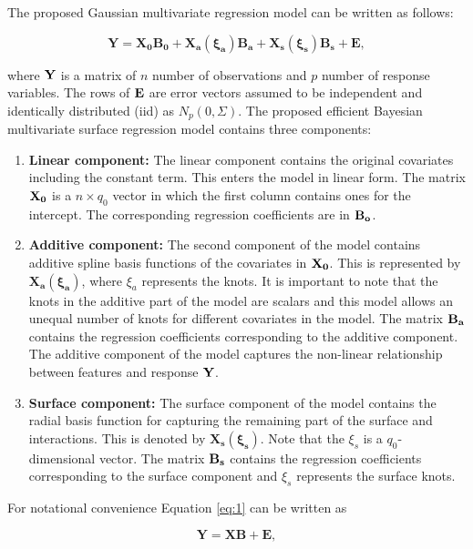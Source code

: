 \documentclass[11pt,a4paper,]{article}
\begin{document}
The proposed Gaussian multivariate regression model can be written as follows:

\begin{equation}
  \label{eq:1}
\boldsymbol{Y=X_0B_0+{X_a}(\xi_a)B_a+{X_s}(\xi_s)B_s+E},
\end{equation}

where \(\bold{Y}\) is a matrix of \(n\) number of observations and \(p\) number of response variables. The rows of \(\bold{E}\) are error vectors assumed to be independent and identically distributed (iid) as \(N_p(0,\Sigma)\). The proposed efficient Bayesian multivariate surface regression model contains three components:

\begin{enumerate}
\def\labelenumi{\arabic{enumi}.}
\item
  \textbf{Linear component: } The linear component contains the original covariates including the constant term. This enters the model in linear form. The matrix \(\bold{X_0}\) is a \(n \times q_0\) vector in which the first column contains ones for the intercept. The corresponding regression coefficients are in \(\bold{B_o}\).
\item
  \textbf{Additive component: } The second component of the model contains additive spline basis functions of the covariates in \(\bold{X_0}\). This is represented by \(\boldsymbol{X_a(\xi_a)}\), where \(\xi_a\) represents the knots. It is important to note that the knots in the additive part of the model are scalars and this model allows an unequal number of knots for different covariates in the model. The matrix \(\bold{B_a}\) contains the regression coefficients corresponding to the additive component. The additive component of the model captures the non-linear relationship between features and response \(\bold{Y}\).
\item
  \textbf{Surface component: } The surface component of the model contains the radial basis function for capturing the remaining part of the surface and interactions. This is denoted by \(\boldsymbol{X_s(\xi_s)}\). Note that the \(\xi_s\) is a \(q_0\)-dimensional vector. The matrix \(\bold{B_s}\) contains the regression coefficients corresponding to the surface component and \(\xi_s\) represents the surface knots.
\end{enumerate}

For notational convenience Equation \eqref{eq:1} can be written as

\begin{equation} 
  \mathbf{Y}=\mathbf{XB+E},
  \label{eq:eqn2}
\end{equation}
\end{document}
